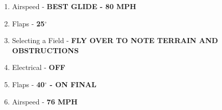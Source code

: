 \documentclass[8pt]{article}
\newenvironment{checklist}%
               {\begin{enumerate}%
                   \setlength{\itemsep}{0pt}%
                   \setlength{\parskip}{0pt}}%
               {\end{enumerate}}
\begin{document}
\begin{multicols}{3}
\begin{checklist}
  
\item Airspeed - \textbf{BEST GLIDE - 80 MPH}
\item Flaps - \textbf{25$^\circ$}
\item Selecting a Field - \textbf{FLY OVER TO NOTE TERRAIN AND OBSTRUCTIONS}
\item Electrical - \textbf{OFF}
\item Flaps - \textbf{40$^\circ$ - ON FINAL}
\item Airspeed - \textbf{76 MPH}
  
\end{checklist}


\end{multicols}
\end{document}
